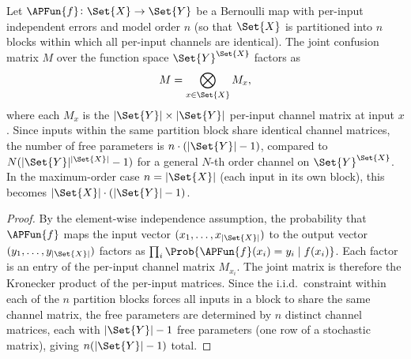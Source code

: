 \documentclass[ ../main.tex]{subfiles}
\begin{document}
\begin{theorem}
\label{thm:kronecker}
Let $\APFun{f} \colon \Set{X} \to \Set{Y}$ be a Bernoulli map with per-input independent errors and model order $n$ (so that $\Set{X}$ is partitioned into $n$ blocks within which all per-input channels are identical).
The joint confusion matrix $M$ over the function space $\Set{Y}^{\Set{X}}$ factors as
\begin{equation}
M = \bigotimes_{x \in \Set{X}} M_x,
\end{equation}
where each $M_x$ is the $|\Set{Y}| \times |\Set{Y}|$ per-input channel matrix at input $x$.
Since inputs within the same partition block share identical channel matrices, the number of free parameters is $n \cdot (|\Set{Y}| - 1)$, compared to $N(|\Set{Y}|^{|\Set{X}|} - 1)$ for a general $N$-th order channel on $\Set{Y}^{\Set{X}}$.
In the maximum-order case $n = |\Set{X}|$ (each input in its own block), this becomes $|\Set{X}| \cdot (|\Set{Y}| - 1)$.
\end{theorem}
\begin{proof}
By the element-wise independence assumption, the probability that $\APFun{f}$ maps the input vector $(x_1, \ldots, x_{|\Set{X}|})$ to the output vector $(y_1, \ldots, y_{|\Set{X}|})$ factors as
$\prod_{i} \Prob{\APFun{f}(x_i) = y_i \mid f(x_i)}$.
Each factor is an entry of the per-input channel matrix $M_{x_i}$.
The joint matrix is therefore the Kronecker product of the per-input matrices.
Since the i.i.d.\ constraint within each of the $n$ partition blocks forces all inputs in a block to share the same channel matrix, the free parameters are determined by $n$ distinct channel matrices, each with $|\Set{Y}| - 1$ free parameters (one row of a stochastic matrix), giving $n(|\Set{Y}| - 1)$ total.
\end{proof}
\end{document}
